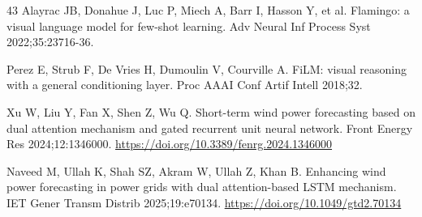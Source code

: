 \begin{thebibliography}{43}
Alayrac JB, Donahue J, Luc P, Miech A, Barr I, Hasson Y, et al. Flamingo: a visual language model for few-shot learning. Adv Neural Inf Process Syst 2022;35:23716-36.

Perez E, Strub F, De Vries H, Dumoulin V, Courville A. FiLM: visual reasoning with a general conditioning layer. Proc AAAI Conf Artif Intell 2018;32.

Xu W, Liu Y, Fan X, Shen Z, Wu Q. Short-term wind power forecasting based on dual attention mechanism and gated recurrent unit neural network. Front Energy Res 2024;12:1346000. \url{https://doi.org/10.3389/fenrg.2024.1346000}

Naveed M, Ullah K, Shah SZ, Akram W, Ullah Z, Khan B. Enhancing wind power forecasting in power grids with dual attention-based LSTM mechanism. IET Gener Transm Distrib 2025;19:e70134. \url{https://doi.org/10.1049/gtd2.70134}

\end{thebibliography}
